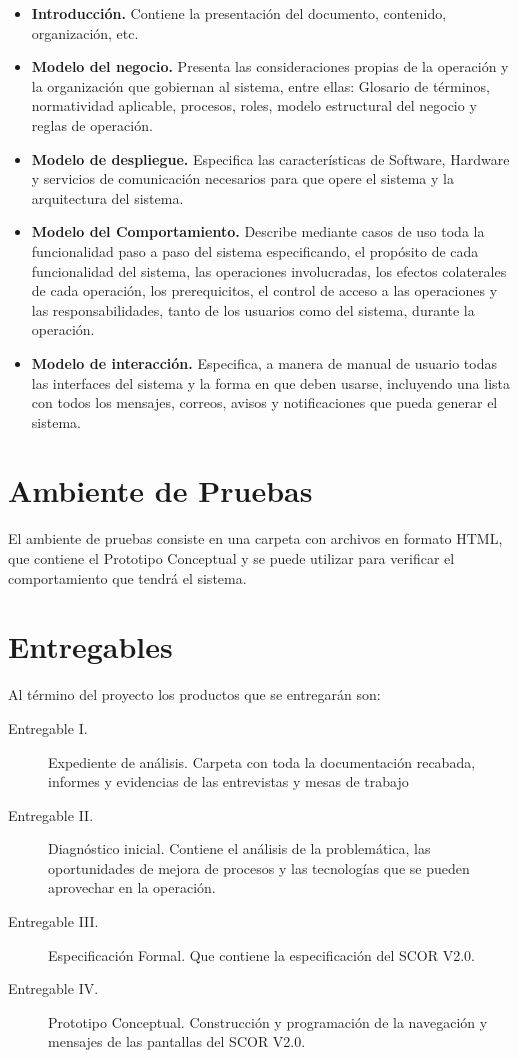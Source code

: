\documentclass[10pt]{book}
\begin{document}
\begin{itemize}
	\item {\bf Introducción.} Contiene la presentación del documento, contenido, organización, etc.
	\item {\bf Modelo del negocio.} Presenta las consideraciones propias de la operación y la organización que gobiernan al sistema, entre ellas: Glosario de términos, normatividad aplicable, procesos, roles, modelo estructural del negocio y reglas de operación.
	\item {\bf Modelo de despliegue.} Especifica las características de Software, Hardware y servicios de comunicación necesarios para que opere el sistema y la arquitectura del sistema.
	\item {\bf Modelo del Comportamiento.} Describe mediante casos de uso toda la funcionalidad paso a paso del sistema especificando, el propósito de cada funcionalidad del sistema, las operaciones involucradas, los efectos colaterales de cada operación, los prerequicitos, el control de acceso a las operaciones y las responsabilidades, tanto de los usuarios como del sistema, durante la operación.
	\item {\bf Modelo de interacción.} Especifica, a manera de manual de usuario todas las interfaces del sistema y la forma en que deben usarse, incluyendo una lista con todos los mensajes, correos, avisos y notificaciones que pueda generar el sistema.
\end{itemize}


\section{Ambiente de Pruebas}

	El ambiente de pruebas consiste en una carpeta con archivos en formato HTML, que contiene el Prototipo Conceptual y se puede utilizar para verificar el comportamiento que tendrá el sistema.

\section{Entregables}
	
	Al término del proyecto los productos que se entregarán son:
	
\begin{description}
	\item [Entregable I.] Expediente de análisis. Carpeta con toda la documentación recabada, informes y evidencias de las entrevistas y mesas de trabajo
	\item [Entregable II.] Diagnóstico inicial. Contiene el análisis de la problemática, las oportunidades de mejora de procesos y las tecnologías que se pueden aprovechar en la operación.
	\item [Entregable III.] Especificación Formal. Que contiene la especificación del SCOR V2.0.
	\item [Entregable IV.] Prototipo Conceptual. Construcción y programación de la navegación y mensajes de las pantallas del SCOR V2.0.
\end{description}
\end{document}
